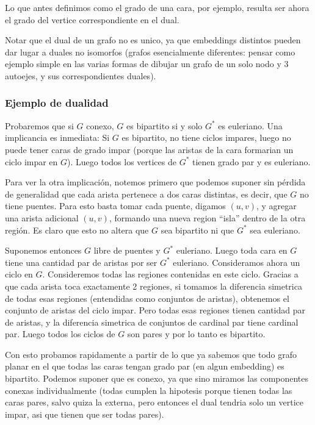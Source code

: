 \documentclass{article}
\begin{document}
Lo que antes definimos como el grado de una cara, por ejemplo, resulta ser ahora el grado del vertice correspondiente en el dual.

Notar que el dual de un grafo no es unico, ya que embeddings distintos pueden dar lugar a duales no isomorfos 
(grafos esencialmente diferentes: pensar como ejemplo simple en las varias formas de dibujar un grafo de un solo nodo y 3 autoejes, y sus
correspondientes duales).

\subsubsection{Ejemplo de dualidad}

Probaremos que si $G$ conexo, $G$ es bipartito si y solo $G^*$ es euleriano. Una implicancia es inmediata: Si $G$ es bipartito,
no tiene ciclos impares, luego no puede tener caras de grado impar (porque las aristas de la cara formarian un ciclo impar en $G$).
Luego todos los vertices de $G^*$ tienen grado par y es euleriano.

Para ver la otra implicación, notemos primero que podemos suponer sin pérdida de generalidad que cada arista pertenece a dos caras distintas,
es decir, que $G$ no tiene puentes. Para esto basta tomar cada puente, digamos $(u,v)$, y agregar una arista adicional $(u,v)$, formando
una nueva region ``isla'' dentro de la otra región. Es claro que esto no altera que $G$ sea bipartito ni que $G^*$ sea euleriano.

Suponemos entonces $G$ libre de puentes y $G^*$ euleriano. Luego toda cara en $G$ tiene una cantidad par de aristas por ser $G^*$ euleriano.
Consideramos ahora un ciclo en $G$. Consideremos todas las regiones contenidas en este ciclo. Gracias a que cada arista
toca exactamente 2 regiones, si tomamos la diferencia simetrica de todas esas regiones (entendidas como conjuntos de aristas), obtenemos
el conjunto de aristas del ciclo impar. Pero todas esas regiones tienen cantidad par de aristas, y la diferencia simetrica de conjuntos
de cardinal par tiene cardinal par. Luego todos los ciclos de $G$ son pares y por lo tanto es bipartito.

Con esto probamos rapidamente a partir de lo que ya sabemos que todo grafo planar en el que todas las caras
tengan grado par (en algun embedding) es bipartito. Podemos suponer que es conexo, ya que sino miramos las componentes conexas
individualmente (todas cumplen la hipotesis porque tienen todas las caras pares, salvo quiza la externa, pero entonces el dual tendria
solo un vertice impar, asi que tienen que ser todas pares).
\end{document}
